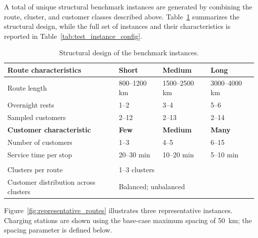 \documentclass[3p,11pt,authoryear]{elsarticle}  %
\begin{document}
A total of  unique structural benchmark instances are generated by combining the route, cluster, and customer classes described above. Table~\ref{tab:benchmark_structure} summarizes the structural design, while the full set of instances and their characteristics is reported in Table~\ref{tab:test_instance_config}.


\begin{table}[!htbp]
\caption{Structural design of the benchmark instances.}
\label{tab:benchmark_structure}
\centering
\small
\setlength{\tabcolsep}{7pt}
\renewcommand{\arraystretch}{1.15}
\begin{tabular}{@{}llll@{}}
\toprule

\textbf{Route characteristics} & \textbf{Short} & \textbf{Medium} & \textbf{Long} \\
\midrule
Route length
& 800--1200 km
& 1500--2500 km
& 3000--4000 km \\

Overnight rests
& 1--2
& 3--4
& 5--6 \\

Sampled customers
& 2--12
& 2--13
& 2--14 \\

\addlinespace[5pt]
\textbf{Customer characteristic} & \textbf{Few} & \textbf{Medium} & \textbf{Many} \\
\midrule
Number of customers
& 1--3
& 4--5
& 6--15 \\

Service time per stop
& 20--30 min
& 10--20 min
& 5--10 min \\

\addlinespace[5pt]
\multicolumn{4}{@{}l}{\textbf{Cluster characteristics}} \\
\midrule
Clusters per route
& \multicolumn{3}{l}{1--3 clusters} \\

Customer distribution across clusters
& \multicolumn{3}{l}{Balanced; unbalanced} \\

\bottomrule
\end{tabular}
\end{table}



Figure~\ref{fig:representative_routes} illustrates three representative instances. Charging stations are shown using the base-case maximum spacing of 50~km; the spacing parameter is defined below.
\end{document}
